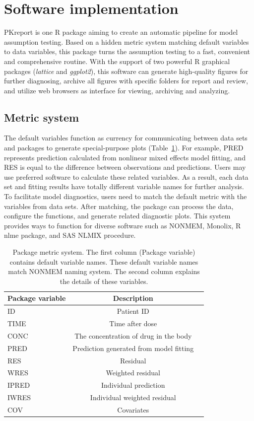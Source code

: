 \documentclass[a4paper]{article}
\begin{document}
\section{Software implementation}

PKreport is one R package aiming to create an automatic pipeline for model assumption testing. Based on a hidden metric system matching default variables to data variables, this package turns the assumption testing to a fast, convenient and comprehensive routine. With the support of two powerful R graphical packages (\textit{lattice} and \textit{ggplot2}), this software can generate high-quality figures for further diagnosing, archive all figures with specific folders for report and review, and utilize web browsers as interface for viewing, archiving and analyzing.

\subsection{Metric system}

The default variables function as currency for communicating between data sets and packages to generate special-purpose plots (Table~\ref{c2_s3_t1}). For example, PRED represents prediction calculated from nonlinear mixed effects model fitting, and RES is equal to the difference between observations and predictions. Users may use preferred software to calculate these related variables. As a result, each data set and fitting results have totally different variable names for further analysis. To facilitate model diagnostics, users need to match the default metric with the variables from data sets. After matching, the package can process the data, configure the functions, and generate related diagnostic plots. This system provides ways to function for diverse software such as NONMEM, Monolix, R nlme package, and SAS NLMIX procedure.

\begin{table}[h!tb] \centering
\begin{tabular}{lcc} \hline
\textbf{Package variable} & \textbf{Description}  \\ \hline
ID & Patient ID \\
TIME & Time after dose \\
CONC & The concentration of drug in the body \\
PRED & Prediction generated from model fitting \\
RES & Residual \\
WRES & Weighted residual \\
IPRED & Individual prediction \\
IWRES & Individual weighted residual \\
COV & Covariates \\ \hline
\end{tabular}
\caption{Package metric system. The first column (Package variable) contains default variable names. These default variable names match NONMEM naming system. The second column explains the details of these variables.}
\label{c2_s3_t1}
\end{table}
\end{document}
